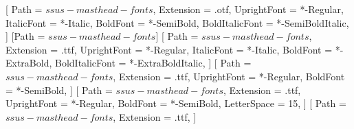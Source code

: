 
\usepackage{fontspec}
\setmainfont{IBMPlexSerif}[
  Path        = $ssus-masthead-fonts$,
  Extension   = .otf,
  UprightFont = *-Regular,
  ItalicFont  = *-Italic,
  BoldFont    = *-SemiBold,
  BoldItalicFont = *-SemiBoldItalic,
]
[Path = $ssus-masthead-fonts$]
\setsansfont{LibreFranklin}[
  Path        = $ssus-masthead-fonts$,
  Extension   = .ttf,
  UprightFont = *-Regular,
  ItalicFont  = *-Italic,
  BoldFont    = *-ExtraBold,
  BoldItalicFont = *-ExtraBoldItalic,
]
\setmonofont{IBMPlexMono}[
  Path        = $ssus-masthead-fonts$,
  Extension   = .ttf,
  UprightFont = *-Regular,
  BoldFont    = *-SemiBold,
]
\newfontfamily{}[
  Path        = $ssus-masthead-fonts$,
  Extension   = .ttf,
  UprightFont = *-Regular,
  BoldFont    = *-SemiBold,
  LetterSpace = 15,
]
\newfontfamily{}[
  Path      = $ssus-masthead-fonts$,
  Extension = .ttf,
]

